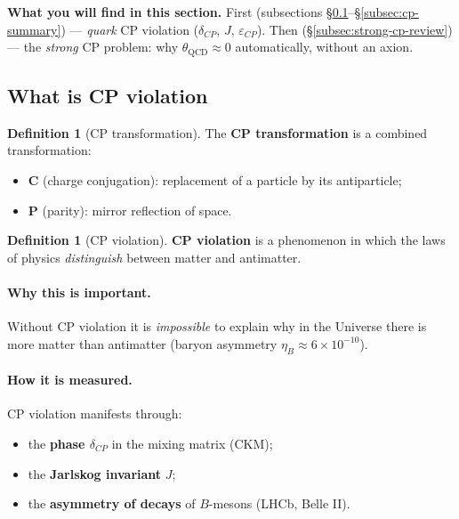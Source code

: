 \documentclass[11pt,a4paper]{article}
\theoremstyle{definition}
\newtheorem{definition}[theorem]{Definition}
\begin{document}
\medskip\noindent
\textbf{What you will find in this section.}
First (subsections \S\ref{subsec:cp-what}--\S\ref{subsec:cp-summary}) 
— \emph{quark} CP violation ($\delta_{CP}$, $J$, 
$\varepsilon_{CP}$). 
Then (\S\ref{subsec:strong-cp-review}) — the \emph{strong} CP problem: 
why $\theta_{\text{QCD}} \approx 0$ automatically, without an axion.

\subsection{What is CP violation}
\label{subsec:cp-what}

\begin{definition}[CP transformation]
\label{def:cp}
The \textbf{CP transformation} is a combined transformation:
\begin{itemize}
    \item \textbf{C} (charge conjugation): replacement of a particle 
          by its antiparticle;
    \item \textbf{P} (parity): mirror reflection of space.
\end{itemize}
\end{definition}

\begin{definition}[CP violation]
\label{def:cp-violation}
\textbf{CP violation} is a phenomenon in which the laws of physics 
\emph{distinguish} between matter and antimatter.
\end{definition}

\paragraph{Why this is important.}
Without CP violation it is \emph{impossible} to explain why in the Universe 
there is more matter than antimatter (baryon asymmetry 
$\eta_B \approx 6 \times 10^{-10}$).

\paragraph{How it is measured.}
CP violation manifests through:
\begin{itemize}
    \item the \textbf{phase $\delta_{CP}$} in the mixing matrix (CKM);
    \item the \textbf{Jarlskog invariant} $J$;
    \item the \textbf{asymmetry of decays} of $B$-mesons (LHCb, Belle II).
\end{itemize}
\end{document}
